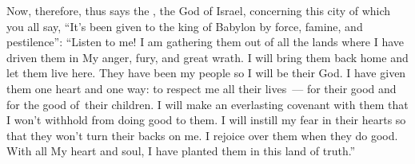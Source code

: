 
\begin{inparaenum}
  
  
  
   Now, therefore, thus says the \lord, the God of Israel, concerning this city of which you all say, ``It's been given to the king of Babylon by force, famine, and pestilence'':%
   ``Listen to me! I am gathering them out of all the lands where I have driven them in My anger, fury, and great wrath. I will bring them back home and let them live here.%
   They have been my people so I will be their God.%
   I have given them one heart and one way: to respect me all their lives~--- for their good and for the good of\understood\ their children.%
   I will make an everlasting covenant with them that I won't withhold from doing good to them. I will instill my fear in their hearts so that they won't turn their backs on me.%
   I rejoice over them when they do good. With all My heart and soul, I have planted them in this land of truth.''%
  
\end{inparaenum}
